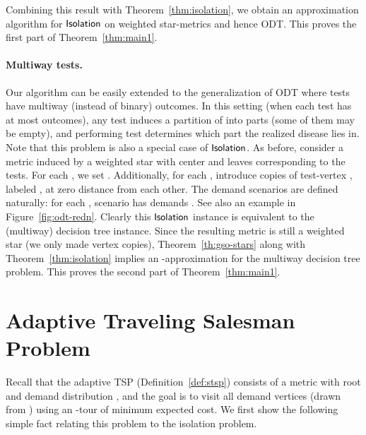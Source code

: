 \documentclass[11pt]{article}
\def\odt{{\sf ODT}\xspace}
\def\isoprob{\ensuremath{{\sf Isolation}}\xspace}
\begin{document}
\medskip Combining this result with Theorem~\ref{thm:isolation}, we obtain an  approximation algorithm for \isoprob on weighted star-metrics and hence \odt. This
proves the first part of Theorem~\ref{thm:main1}.


\paragraph{Multiway tests.}  
Our algorithm
can be easily extended to the generalization of \odt where tests have multiway (instead of binary) outcomes.  In this setting (when each test has at
most  outcomes), any test  induces a partition  of  into  parts (some of them may be empty), and performing test 
determines which part the realized disease lies in. Note that this problem is also a special case of
\isoprob. As before, consider a metric  induced by a weighted star with center  and  leaves corresponding
to the tests. For each , we set . Additionally, for each , introduce  copies
of test-vertex , labeled , at zero distance from each other. The demand scenarios are defined
naturally: for each , scenario  has demands . See also an example in
Figure~\ref{fig:odt-redn}. Clearly this \isoprob instance is equivalent to the (multiway) decision tree instance.
Since the resulting metric is still a weighted star (we only made vertex copies), Theorem~\ref{th:gso-stars} along with Theorem~\ref{thm:isolation} implies an -approximation for the multiway decision tree
problem. This proves the second part of Theorem~\ref{thm:main1}.





\section{Adaptive Traveling Salesman Problem}\label{sec:stsp}


Recall that the adaptive TSP (Definition~\ref{def:stsp}) 
consists of a metric  with root  and demand distribution , and the goal  is to visit all demand vertices (drawn from ) using an -tour of minimum  expected cost.   We first show the following simple fact relating this problem to the isolation problem.
\end{document}
